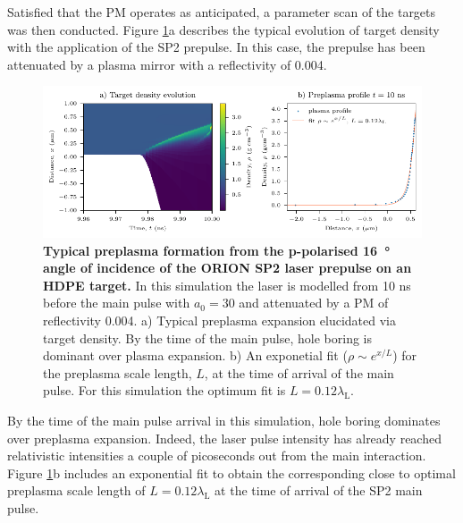 Satisfied that the PM operates as anticipated, a parameter scan of the targets was then conducted. Figure \ref{fig:oriontargetpreplasma}a describes the typical evolution of target density with the application of the SP2 prepulse. In this case, the prepulse has been attenuated by a plasma mirror with a reflectivity of 0.004.
\begin{figure}
	\centering
	\includegraphics{figures/orion/orion_target_preplasma}
	\caption[Typical preplasma formation from the incidence of the ORION SP2 laser prepulse on a plastic target.]{\textbf{Typical preplasma formation from the p-polarised \qty{16}{\degree} angle of incidence of the ORION SP2 laser prepulse on an HDPE target.} In this simulation the laser is modelled from 10 ns before the main pulse with $a_0 = 30$ and attenuated by a PM of reflectivity 0.004. a) Typical preplasma expansion elucidated via target density. By the time of the main pulse, hole boring is dominant over plasma expansion. b) An exponetial fit ($\rho \sim e^{x/L}$) for the preplasma scale length, $L$, at the time of arrival of the main pulse. For this simulation the optimum fit is $L = 0.12 \lambda_\mathrm{L}$.}
	\label{fig:oriontargetpreplasma}
\end{figure}
By the time of the main pulse arrival in this simulation, hole boring dominates over preplasma expansion. Indeed, the laser pulse intensity has already reached relativistic intensities a couple of picoseconds out from the main interaction. Figure \ref{fig:oriontargetpreplasma}b includes an exponential fit to obtain the corresponding close to optimal preplasma scale length of $L = 0.12 \lambda_\mathrm{L}$ at the time of arrival of the SP2 main pulse.

